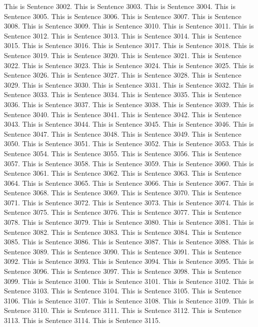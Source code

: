 \documentclass{article}
\begin{document}
This is Sentence 3002.
This is Sentence 3003.
This is Sentence 3004.
This is Sentence 3005.
This is Sentence 3006.
This is Sentence 3007.
This is Sentence 3008.
This is Sentence 3009.
This is Sentence 3010.
This is Sentence 3011.
This is Sentence 3012.
This is Sentence 3013.
This is Sentence 3014.
This is Sentence 3015.
This is Sentence 3016.
This is Sentence 3017.
This is Sentence 3018.
This is Sentence 3019.
This is Sentence 3020.
This is Sentence 3021.
This is Sentence 3022.
This is Sentence 3023.
This is Sentence 3024.
This is Sentence 3025.
This is Sentence 3026.
This is Sentence 3027.
This is Sentence 3028.
This is Sentence 3029.
This is Sentence 3030.
This is Sentence 3031.
This is Sentence 3032.
This is Sentence 3033.
This is Sentence 3034.
This is Sentence 3035.
This is Sentence 3036.
This is Sentence 3037.
This is Sentence 3038.
This is Sentence 3039.
This is Sentence 3040.
This is Sentence 3041.
This is Sentence 3042.
This is Sentence 3043.
This is Sentence 3044.
This is Sentence 3045.
This is Sentence 3046.
This is Sentence 3047.
This is Sentence 3048.
This is Sentence 3049.
This is Sentence 3050.
This is Sentence 3051.
This is Sentence 3052.
This is Sentence 3053.
This is Sentence 3054.
This is Sentence 3055.
This is Sentence 3056.
This is Sentence 3057.
This is Sentence 3058.
This is Sentence 3059.
This is Sentence 3060.
This is Sentence 3061.
This is Sentence 3062.
This is Sentence 3063.
This is Sentence 3064.
This is Sentence 3065.
This is Sentence 3066.
This is Sentence 3067.
This is Sentence 3068.
This is Sentence 3069.
This is Sentence 3070.
This is Sentence 3071.
This is Sentence 3072.
This is Sentence 3073.
This is Sentence 3074.
This is Sentence 3075.
This is Sentence 3076.
This is Sentence 3077.
This is Sentence 3078.
This is Sentence 3079.
This is Sentence 3080.
This is Sentence 3081.
This is Sentence 3082.
This is Sentence 3083.
This is Sentence 3084.
This is Sentence 3085.
This is Sentence 3086.
This is Sentence 3087.
This is Sentence 3088.
This is Sentence 3089.
This is Sentence 3090.
This is Sentence 3091.
This is Sentence 3092.
This is Sentence 3093.
This is Sentence 3094.
This is Sentence 3095.
This is Sentence 3096.
This is Sentence 3097.
This is Sentence 3098.
This is Sentence 3099.
This is Sentence 3100.
This is Sentence 3101.
This is Sentence 3102.
This is Sentence 3103.
This is Sentence 3104.
This is Sentence 3105.
This is Sentence 3106.
This is Sentence 3107.
This is Sentence 3108.
This is Sentence 3109.
This is Sentence 3110.
This is Sentence 3111.
This is Sentence 3112.
This is Sentence 3113.
This is Sentence 3114.
This is Sentence 3115.
\end{document}
